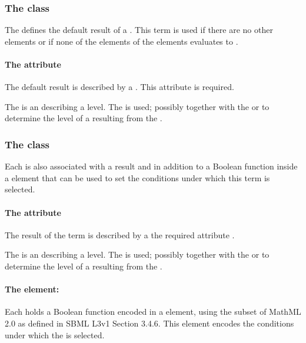 \subsubsection{The \DefaultTerm class}
\label{defaultTerm-class}
The \DefaultTerm defines the default result of a \Transition.  This term is used if there are no other \FunctionTerm elements or if none of the  elements of the \FunctionTerm elements evaluates to .

\paragraph{The  attribute}
The default result is described by a . This attribute is required.

The  is an  describing a level.  The  is used; possibly together with the  or  to determine the level of a \QualitativeSpecies resulting from the \Transition. 

\subsubsection{The  class}
\label{sec:function-term}

Each \FunctionTerm is also associated with a result  and in addition to a Boolean function inside a  element that can be used to set the conditions under which this term is selected.

\paragraph{The  attribute}
The result of the term is described by a the required attribute .

The  is an  describing a level.   The  is used; possibly together with the  or  to determine the level of a \QualitativeSpecies resulting from the \Transition. 

\paragraph{The  element:}
Each  holds a Boolean function encoded in a  element, using the subset of MathML 2.0 as defined in SBML L3v1 Section 3.4.6.
This element encodes the conditions under which the \FunctionTerm is selected.

